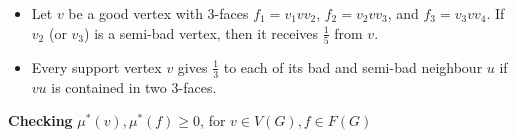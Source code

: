 \documentclass[12pt, reqno]{amsart}
\theoremstyle{plain}
\theoremstyle{definition}
\numberwithin{equation}{section}
\begin{document}
\begin{itemize}




\item[\textbf{R9:}] Let $v$ be a good vertex with $3$-faces $f_1=v_1vv_2$, $f_2=v_2vv_3$, and $f_3=v_3vv_4$.
 If  $v_2$ (or $v_3$) is a  semi-bad vertex, then it receives $\frac{1}{5}$ from $v$.

\item[\textbf{R10:}] Every support vertex $v$ gives $\frac{1}{3}$ to each of its bad and semi-bad neighbour $u$ if $vu$ is contained in two $3$-faces.



\end{itemize}

\vspace*{1em}


\noindent
\textbf{Checking} $\mu^*(v), \mu^*(f)\geq 0$, for $v\in V(G), f\in F(G)$\medskip
\end{document}
